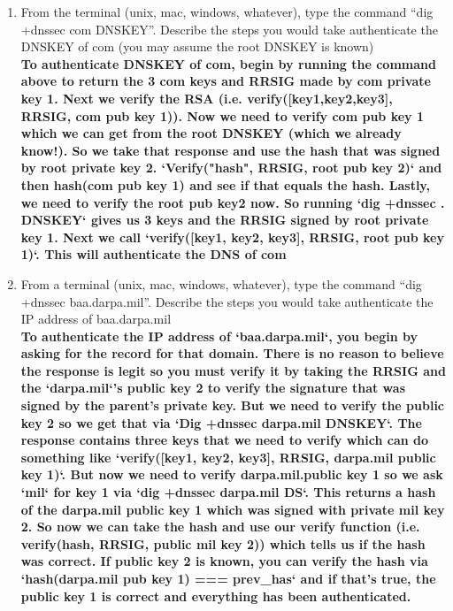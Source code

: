 \documentclass[12pt]{article}
\begin{document}
\renewcommand{\headrulewidth}{0.4pt}
\vspace{-3mm}
\begin{enumerate}
  \item From the terminal (unix, mac, windows, whatever), type the command “dig +dnssec com DNSKEY”. Describe the steps you would take authenticate the DNSKEY of com (you may assume the root DNSKEY is known) \\

  \textbf{To authenticate DNSKEY of com, begin by running the command above to return the 3 com keys and RRSIG made by com private key 1. Next we verify the RSA (i.e. verify([key1,key2,key3], RRSIG, com pub key 1)). Now we need to verify com pub key 1 which we can get from the root DNSKEY (which we already know!). So we take that response and use the hash that was signed by root private key 2. `Verify("hash", RRSIG, root pub key 2)` and then hash(com pub key 1) and see if that equals the hash. Lastly, we need to verify the root pub key2 now. So running `dig +dnssec . DNSKEY` gives us 3 keys and the RRSIG signed by root private key 1. Next we call `verify([key1, key2, key3], RRSIG, root pub key 1)`. This will authenticate the DNS of com } \\

  \item From a terminal (unix, mac, windows, whatever), type the command “dig +dnssec baa.darpa.mil”. Describe the steps you would take authenticate the IP address of baa.darpa.mil \\

  \textbf{To authenticate the IP address of `baa.darpa.mil`, you begin by asking for the record for that domain. There is no reason to believe the response is legit so you must verify it by taking the RRSIG and the `darpa.mil`'s public key 2 to verify the signature that was signed by the parent's private key.
  But we need to verify the public key 2 so we get that via `Dig +dnssec darpa.mil DNSKEY`. The response contains three keys that we need to verify which can do something like `verify([key1, key2, key3], RRSIG, darpa.mil public key 1)`. But now we need to verify darpa.mil.public key 1 so we ask `mil` for key 1 via `dig +dnssec darpa.mil DS`. This returns a hash of the darpa.mil public key 1 which was signed with private mil key 2. So now we can take the hash and use our verify function (i.e. verify(hash, RRSIG, public mil key 2)) which tells us if the hash was correct. If public key 2 is known, you can verify the hash via `hash(darpa.mil pub key 1) === prev_has` and if that's true, the public key 1 is correct and everything has been authenticated.} \\\


\end{enumerate}
\end{document}

